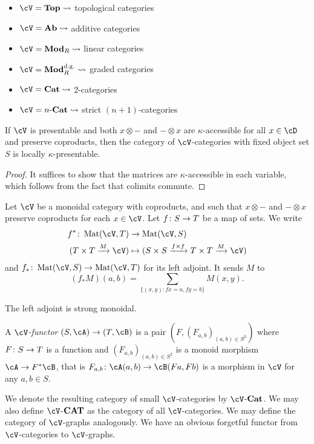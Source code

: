 \documentclass[a4paper,11pt,oneside,openany]{scrbook}
\begin{document}
\begin{exmp}
	\begin{itemize}
		\item $\cV= \Top \leadsto $ topological categories
		\item $\cV= \Ab \leadsto $ additive categories
		\item $\cV= \Mod_R \leadsto $ linear categories
		\item $\cV= \Mod_R^{\text{d.g.}} \leadsto $ graded categories
		\item $\cV= \Cat \leadsto $ 2-categories
		\item $\cV= n\text{-}\Cat \leadsto $ strict $ (n+1) $-categories
	\end{itemize}
\end{exmp}
\begin{prop}
	If $\cV$ is presentable and both $ x\otimes - $ and $ - \otimes x $ are $ \kappa $-accessible for all $ x\in \cD $ and preserve coproducts, then the category of $\cV$-categories with fixed object set $ S $ is locally $ \kappa $-presentable.
\end{prop}
\begin{proof}
	It suffices to show that the matrices are $ \kappa $-accessible in each variable, which follows from the fact that colimits commute.
\end{proof}
\begin{defn}
	Let $\cV$ be a monoidal category with coproducts, and such that $
		x\otimes - $ and $ - \otimes x $ preserve coproducts for each $ x \in\cV$.
	Let $ f \colon S \to T $ be a map of sets.
	We write
	\begin{align*}
		f^* \from \Mat(\cV ,T)          & \to \Mat(\cV, S)                                                            \\
		( T\times T \xrightarrow{M}\cV) & \mapsto ( S\times S \xrightarrow{f \times  f} T\times T \xrightarrow{M}\cV)
	\end{align*}
	and $ f_* \from \Mat(\cV,S)\to \Mat(\cV,T) $ for its left adjoint.
	It sends $ M $ to
	\begin{displaymath}
		(f_* M)(a,b) = \sum_{\{(x,y)\colon fx = a, fy = b \} }M(x,y).
	\end{displaymath}
\end{defn}
\begin{prop}
	The left adjoint is strong monoidal.
\end{prop}
\begin{defn}
	A $\cV$\emph{-functor} $ (S,\cA) \to (T,\cB) $ is a pair
	$ (F, (F_{a,b})_{(a,b) \in S^2}) $ where $ F\colon S \to T $ is a function and $ (F_{a,b})_{(a,b) \in S^2} $ is a monoid morphism $ \cA \to F^*\cB $, that is $ F_{a,b}\from \cA (a,b) \to \cB (Fa,Fb) $ is a morphism in $\cV$ for any $ a,b \in S $.

	We denote the resulting category of small $\cV$-categories by $\cV$-$ {\normalfont\textbf{Cat}} $. We may also define $\cV$-$ {\normalfont\textbf{CAT}} $ as the category of all $\cV$-categories.
	We may define the category of $\cV$-graphs analogously. We have an
	obvious forgetful functor from $\cV$-categories to $\cV$-graphs.
\end{defn}
\end{document}
